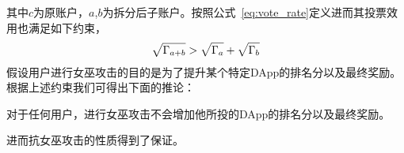 其中$c$为原账户，$a$,$b$为拆分后子账户。按照公式~\ref{eq:vote_rate}定义进而其投票效用也满足如下约束，
\begin{align}
\label{eq:sqrt_nr}
\sqrt{\Gamma_{a+b}}>\sqrt{\Gamma_a}+\sqrt{\Gamma_b}
\end{align}
假设用户进行女巫攻击的目的是为了提升某个特定DApp的排名分以及最终奖励。根据上述约束我们可得出下面的推论：
\begin{property}
	\label{p3}
	对于任何用户，进行女巫攻击不会增加他所投的DApp的排名分以及最终奖励。
\end{property}
进而抗女巫攻击的性质得到了保证。

	
	
